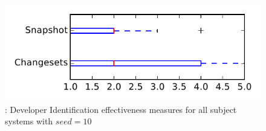 
\begin{figure}
\centering
\includegraphics[height=0.4\textheight]{figures/dit_seed/rq1_tiny_10}
\caption{\rtwo: Developer Identification effectiveness measures for all subject systems with $seed=10$}
\label{fig:dit_seed:rq1:tiny}
\end{figure}
